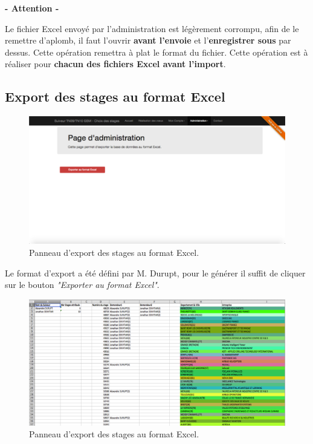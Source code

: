 \documentclass[a4paper,titlepage]{scrartcl}
\begin{document}
\clearpage

\LARGE
\begin{center}
\textbf{- Attention -}\\
\end{center}
\normalsize

Le fichier Excel envoyé par l'administration est légèrement corrompu, afin de le remettre d'aplomb, il faut l'ouvrir \textbf{avant l'envoie} et l'\textbf{enregistrer sous} par dessus. Cette opération remettra à plat le format du fichier. Cette opération est à réaliser pour \textbf{chacun des fichiers Excel avant l'import}.

\subsection{Export des stages au format Excel}

\begin{figure}[H]
	\vspace{-3mm}
	\begin{center}
		\includegraphics[scale=0.33]{Images/admin_export.png}
		\caption{Panneau d'export des stages au format Excel.}
		\vspace{-5mm}
	\end{center}
\end{figure}


Le format d'export a été défini par M. Durupt, pour le générer il suffit de cliquer sur le bouton \textit{"Exporter au format Excel"}.\\

\begin{figure}[H]
	\vspace{-3mm}
	\begin{center}
		\includegraphics[scale=0.33]{Images/admin_excel.png}
		\caption{Panneau d'export des stages au format Excel.}
		\vspace{-1.5cm}
	\end{center}
\end{figure}
\end{document}
